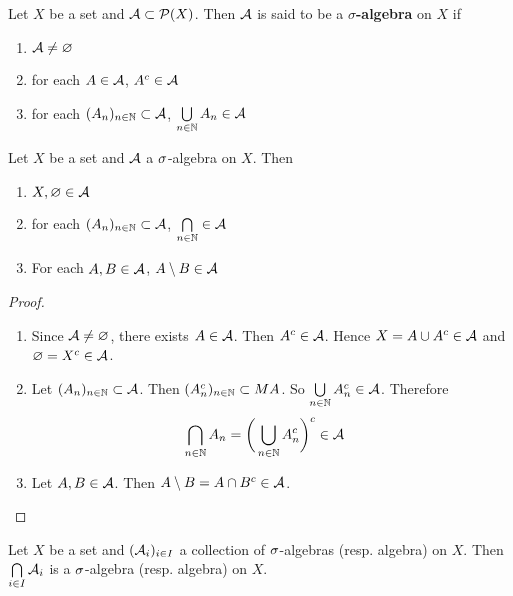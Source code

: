 \documentclass{book}
\begin{document}
	\begin{defn}  
		Let $X$ be a set and $\mathcal{A} \subset \mathcal{P}(X)$. Then $\mathcal{A}$ is said to be a $\sigma$\textbf{-algebra} on $X$ if 
		\begin{enumerate}
			\item $\mathcal{A} \neq \varnothing$
			\item for each $A \in \mathcal{A}$, $A^c \in \mathcal{A}$
			\item for each $(A_n)_{n \in \mathbb{N}} \subset \mathcal{A}$, $\bigcup\limits_{n \in \mathbb{N}}A_n \in \mathcal{A}$
		\end{enumerate}
	\end{defn}
	
	\begin{ex}  
		Let $X$ be a set and $\mathcal{A}$ a $\sigma$-algebra on $X$. Then 
		\begin{enumerate}
			\item $X, \varnothing \in \mathcal{A}$
			\item for each $(A_n)_{n \in \mathbb{N}} \subset \mathcal{A}$, $\bigcap\limits_{n \in \mathbb{N}} \in \mathcal{A}$
			\item For each $A, B \in \mathcal{A}$, $A \setminus B \in \mathcal{A}$  
		\end{enumerate}
	\end{ex}
	
	\begin{proof}\
		\begin{enumerate}
			\item Since $\mathcal{A} \neq \varnothing$, there exists $A \in \mathcal{A}$. Then $A^c \in \mathcal{A}$. Hence $X = A \cup A^c \in \mathcal{A}$ and $\varnothing = X^c \in \mathcal{A}$.
			\item Let $(A_n)_{n \in \mathbb{N}} \subset \mathcal{A}$. Then $(A_n^c)_{n \in \mathbb{N}} \subset MA$. So $\bigcup\limits_{n \in \mathbb{N}}A_n^c \in \mathcal{A}$. Therefore \begin{align*}
				\bigcap\limits_{n \in \mathbb{N}}A_n 
				&= \bigg(\bigcup\limits_{n \in \mathbb{N}}A_n^c\bigg)^c \in \mathcal{A}
			\end{align*}
			\item Let $A,B \in \mathcal{A}$. Then $A \setminus B = A \cap B^c \in \mathcal{A}$. 
		\end{enumerate}
	\end{proof}
	
	\begin{ex}  
		Let $X$ be a set and $(\mathcal{A}_i)_{i \in I}$ a collection of $\sigma$-algebras (resp. algebra) on $X$. Then $\bigcap\limits_{i \in I}\mathcal{A}_i$ is a $\sigma$-algebra (resp. algebra) on $X$.
	\end{ex}
	
\end{document}
